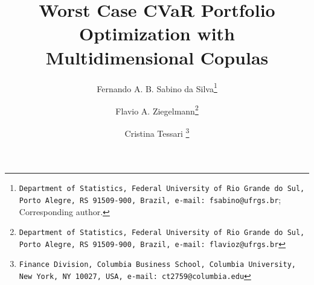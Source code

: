 \documentclass[a4paper,10pt]{article}
\begin{document}
\title{Worst Case CVaR Portfolio Optimization with Multidimensional Copulas}
\author[]{ Fernando A. B. Sabino da Silva\thanks{\texttt{Department of Statistics, Federal University of Rio Grande do Sul, Porto Alegre, RS 91509-900, Brazil, e-mail: fsabino@ufrgs.br}; Corresponding author.}}
\author[]{Flavio A. Ziegelmann\thanks{\texttt{Department of Statistics, Federal University of Rio Grande do Sul, Porto Alegre, RS 91509-900, Brazil, e-mail: flavioz@ufrgs.br}}}
\author[]{Cristina Tessari \thanks{\texttt{Finance Division, Columbia Business School, Columbia University, New York, NY 10027, USA,
			e-mail: ct2759@columbia.edu}}}
\affil[]{}
\date{}
\maketitle
\end{document}
